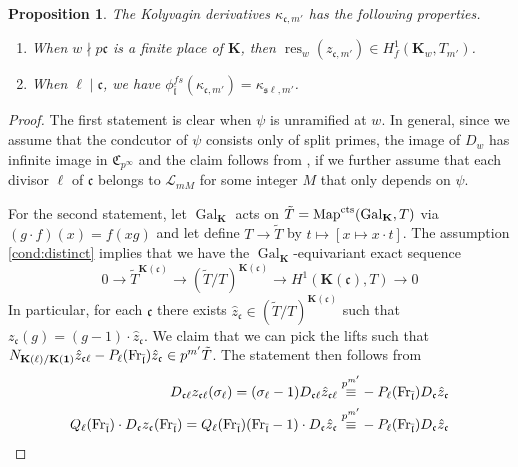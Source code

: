 \documentclass[leqno]{amsart}
\newcommand{\flw}{\bar{\fl}}
\newcommand{\Fr}{\textnormal{Fr}} %
\DeclareMathOperator{\Gal}{Gal}
\newcommand{\cts}{\textnormal{cts}}
\newcommand{\id}{\mathbf{1}}
\newcommand{\K}{{\mathbf{K}}} %
\newcommand{\rp}[1]{\mathfrak{C}_{#1}} %
\newcommand{\rk}[1]{\K({#1})} %
\newcommand{\fc}{\mathfrak{c}}
\newcommand{\fs}{\mathfrak{s}}
\newcommand{\fl}{\mathfrak{l}}
\DeclareMathOperator{\res}{res}
\newtheorem{prop}[thm]{Proposition}
\theoremstyle{definition}
\theoremstyle{remark}
\begin{document}
\begin{prop}
The Kolyvagin derivatives
$\kappa_{\fc,m'}$ has the following properties.
\begin{enumerate}[label=(\alph*)]
\item When $w\nmid p\fc$ is a finite place of  $\K$,
then  $\res_w(z_{\fc,m'})\in H^1_f(\K_w,T_{m'})$.
\item When $\ell\mid\fc$, we have
$\phi_{\flw}^{fs}(\kappa_{\fc,m'})=\kappa_{\fs\ell,m'}$.
\end{enumerate}
\end{prop}
\begin{proof}
The first statement is clear when 
$\psi$ is unramified at $w$.
In general, since we assume
that the condcutor of $\psi$ consists
only of split primes, the 
image of $D_w$ has infinite image in  $\rp{p^\infty}$
and the claim follows from
\cite[Cor 4.6.5]{Rubin},
if we further assume that
each divisor $\ell$ of $\fc$
belongs to  $\mathcal{L}_{mM}$ 
for some integer $M$ that only depends on  $\psi$.

For the second statement, 
let $\Gal_\K$ acts on $\tilde{T}=\text{Map}^{\cts}(\Gal_\K,T)$
via $(g\cdot f)(x)=f(xg)$ and 
let define $T\to\tilde{T}$ by
$t\mapsto [x\mapsto x\cdot t]$.
The assumption \eqref{cond:distinct} implies that
we have the $\Gal_\K$-equivariant 
exact sequence
\[
	0\to\tilde{T}^{\rk{\fc}}\to (\tilde{T}/T)^{\rk{\fc}}\to 
	H^1(\rk{\fc},T)\to 0
\]
In particular, for each $\fc$
there exists $ \hat{z}_\fc\in (\tilde{T}/T)^{\rk{\fc}}$
such that $z_\fc(g)=(g-1)\cdot \hat{z}_\fc$.
We claim that we can pick the lifts such that
$N_{\rk{\ell}/\rk{\id}}\hat{z}_{\fc\ell}-P_\ell(\Fr_{\flw})
\hat{z}_{\fc}\in p^{m'}\tilde{T}$.
The statement then follows from 
\begin{align*}
	D_{\fc\ell}z_{\fc\ell}(\sigma_\ell)=
	(\sigma_\ell-1)D_{\fc\ell}\hat{z}_{\fc\ell}
	\overset{p^{m'}}{\equiv}&
	-P_\ell(\Fr_{\flw}) D_\fc \hat{z}_\fc\\
	Q_\ell(\Fr_{\flw})\cdot
	D_\fc z_\fc(\Fr_{\flw})=
	Q_\ell(\Fr_{\flw})(\Fr_{\flw}-1)
	\cdot D_\fc \hat{z}_\fc
	\overset{p^{m'}}{\equiv}&
	-P_\ell(\Fr_{\flw}) D_\fc \hat{z}_\fc
\end{align*}


\end{proof}
\end{document}
